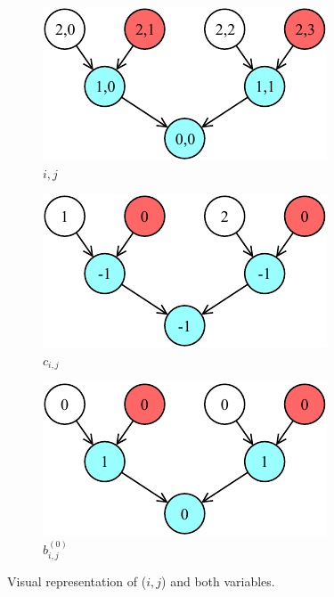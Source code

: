 \documentclass[letterpaper,10pt]{article}
\begin{document}
\begin{figure}[hbtp]
    \centering
    \begin{subfigure}[b]{0.30\textwidth}
        \includegraphics[width=\textwidth]{i.pdf}
        \caption{$i,j$}
        \label{subfig:i}
    \end{subfigure}
    \hspace{0.01\textwidth}
    \begin{subfigure}[b]{0.30\textwidth}
        \includegraphics[width=\textwidth]{ci.pdf}
        \caption{$c_{i,j}$}
        \label{subfig:ci}
    \end{subfigure}
    \hspace{0.01\textwidth}
    \begin{subfigure}[b]{0.30\textwidth}
        \includegraphics[width=\textwidth]{bit.pdf}
        \caption{$b_{i,j}^{(0)}$}
        \label{subfig:bit}
    \end{subfigure}
    \caption{Visual representation of ($i,j$) and both variables.}
    \label{fig:variables}
\end{figure}
\end{document}
